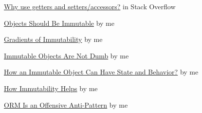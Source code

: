 \documentclass{article}
\begin{document}
\href{https://stackoverflow.com/questions/1568091/why-use-getters-and-setters-accessors}{Why use getters and setters/accessors?} in Stack Overflow

\href{https://www.yegor256.com/2014/06/09/objects-should-be-immutable.html}{Objects Should Be Immutable} by me

\href{https://www.yegor256.com/2016/09/07/gradients-of-immutability.html}{Gradients of Immutability} by me

\href{https://www.yegor256.com/2014/12/22/immutable-objects-not-dumb.html}{Immutable Objects Are Not Dumb} by me

\href{https://www.yegor256.com/2014/12/09/immutable-object-state-and-behavior.html}{How an Immutable Object Can Have State and Behavior?} by me

\href{https://www.yegor256.com/2014/11/07/how-immutability-helps.html}{How Immutability Helps} by me

\href{https://www.yegor256.com/2014/12/01/orm-offensive-anti-pattern.html}{ORM Is an Offensive Anti-Pattern} by me
\end{document}
